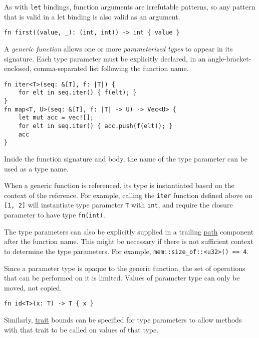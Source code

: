 \documentclass[]{article}
\begin{document}
As with \texttt{let} bindings, function arguments are irrefutable
patterns, so any pattern that is valid in a let binding is also valid as
an argument.

\begin{verbatim}
fn first((value, _): (int, int)) -> int { value }
\end{verbatim}


A \emph{generic function} allows one or more \emph{parameterized types}
to appear in its signature. Each type parameter must be explicitly
declared, in an angle-bracket-enclosed, comma-separated list following
the function name.

\begin{verbatim}
fn iter<T>(seq: &[T], f: |T|) {
    for elt in seq.iter() { f(elt); }
}
fn map<T, U>(seq: &[T], f: |T| -> U) -> Vec<U> {
    let mut acc = vec![];
    for elt in seq.iter() { acc.push(f(elt)); }
    acc
}
\end{verbatim}

Inside the function signature and body, the name of the type parameter
can be used as a type name.

When a generic function is referenced, its type is instantiated based on
the context of the reference. For example, calling the \texttt{iter}
function defined above on \texttt{{[}1, 2{]}} will instantiate type
parameter \texttt{T} with \texttt{int}, and require the closure
parameter to have type \texttt{fn(int)}.

The type parameters can also be explicitly supplied in a trailing
\hyperref[paths]{path} component after the function name. This might be
necessary if there is not sufficient context to determine the type
parameters. For example,
\texttt{mem::size\_of::\textless{}u32\textgreater{}() == 4}.

Since a parameter type is opaque to the generic function, the set of
operations that can be performed on it is limited. Values of parameter
type can only be moved, not copied.

\begin{verbatim}
fn id<T>(x: T) -> T { x }
\end{verbatim}

Similarly, \hyperref[traits]{trait} bounds can be specified for type
parameters to allow methods with that trait to be called on values of
that type.
\end{document}
